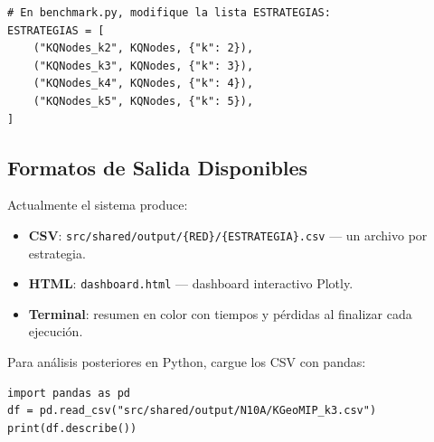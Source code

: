 \begin{lstlisting}[style=python, caption={Ejecutar solo KQNodes en benchmark.}]
# En benchmark.py, modifique la lista ESTRATEGIAS:
ESTRATEGIAS = [
    ("KQNodes_k2", KQNodes, {"k": 2}),
    ("KQNodes_k3", KQNodes, {"k": 3}),
    ("KQNodes_k4", KQNodes, {"k": 4}),
    ("KQNodes_k5", KQNodes, {"k": 5}),
]
\end{lstlisting}

\subsection{Formatos de Salida Disponibles}

Actualmente el sistema produce:
\begin{itemize}[itemsep=4pt]
    \item \textbf{CSV}: \lstinline|src/shared/output/{RED}/{ESTRATEGIA}.csv| — un archivo por estrategia.
    \item \textbf{HTML}: \lstinline|dashboard.html| — dashboard interactivo Plotly.
    \item \textbf{Terminal}: resumen en color con tiempos y pérdidas al finalizar cada ejecución.
\end{itemize}

\begin{tip}
Para análisis posteriores en Python, cargue los CSV con pandas:
\begin{lstlisting}[style=python]
import pandas as pd
df = pd.read_csv("src/shared/output/N10A/KGeoMIP_k3.csv")
print(df.describe())
\end{lstlisting}
\end{tip}
